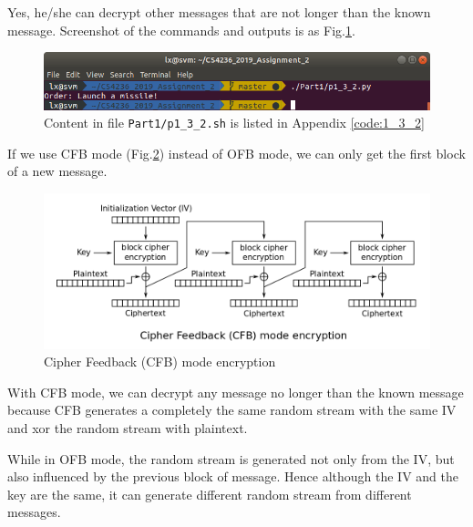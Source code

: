 \subsubsection{}
Yes, he/she can decrypt other messages that are not longer than the known message. Screenshot of the commands and outputs is as Fig.\ref{fig:p1_3_2}.

\begin{figure}[t!]
\centering
\includegraphics[width=\columnwidth]{pictures/p1_3_2.png}
\caption{
    Content in file \texttt{Part1/p1\_3\_2.sh} is listed in Appendix \ref{code:1_3_2}
}
\label{fig:p1_3_2}
\end{figure}

If we use CFB mode (Fig.\ref{fig:CFB_encryption}) instead of OFB mode, we can only get the first block of a new message.

\begin{figure}[ht]
\centering
\includegraphics[width=\columnwidth]{pictures/CFB_encryption.png}
\caption{
    Cipher Feedback (CFB) mode encryption \protect\footnotemark
}
\label{fig:CFB_encryption}
\end{figure}


With CFB mode, we can decrypt any message no longer than the known message because CFB generates a completely the same random stream with the same IV and xor the random stream with plaintext.

While in OFB mode, the random stream is generated not only from the IV, but also influenced by the previous block of message. Hence although the IV and the key are the same, it can generate different random stream from different messages.

